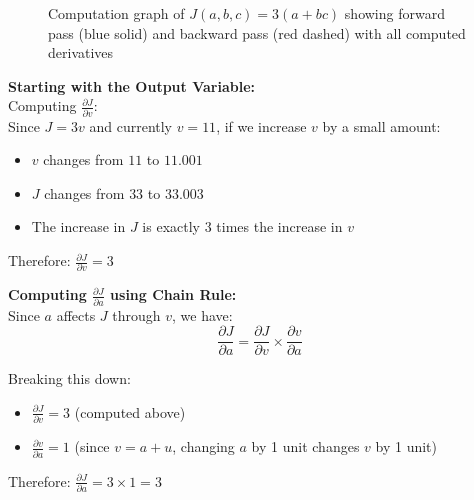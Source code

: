 \documentclass[11pt,a4paper]{article}
\theoremstyle{definition}
\theoremstyle{remark}
\begin{document}
\begin{figure}[H]
    \caption{Computation graph of $J(a,b,c) = 3(a+bc)$ showing forward pass (blue solid) and backward pass (red dashed) with all computed derivatives}
    \label{fig:computation_graph}
\end{figure}

\vspace{0.4cm}

\begin{gradcomp}
\textbf{Starting with the Output Variable:} \\
Computing $\frac{\partial J}{\partial v}$: \\
Since $J = 3v$ and currently $v = 11$, if we increase $v$ by a small amount:
\begin{itemize}
    \item $v$ changes from $11$ to $11.001$
    \item $J$ changes from $33$ to $33.003$
    \item The increase in $J$ is exactly $3$ times the increase in $v$
\end{itemize}

Therefore: $\boxed{\frac{\partial J}{\partial v} = 3}$
\end{gradcomp}

\vspace{0.4cm}

\begin{gradcomp}
\textbf{Computing $\frac{\partial J}{\partial a}$ using Chain Rule:} \\
Since $a$ affects $J$ through $v$, we have:
\[
\frac{\partial J}{\partial a} = \frac{\partial J}{\partial v} \times \frac{\partial v}{\partial a}
\]

Breaking this down:
\begin{itemize}
    \item $\frac{\partial J}{\partial v} = 3$ (computed above)
    \item $\frac{\partial v}{\partial a} = 1$ (since $v = a + u$, changing $a$ by 1 unit changes $v$ by 1 unit)
\end{itemize}

Therefore: $\boxed{\frac{\partial J}{\partial a} = 3 \times 1 = 3}$
\end{gradcomp}
\end{document}
